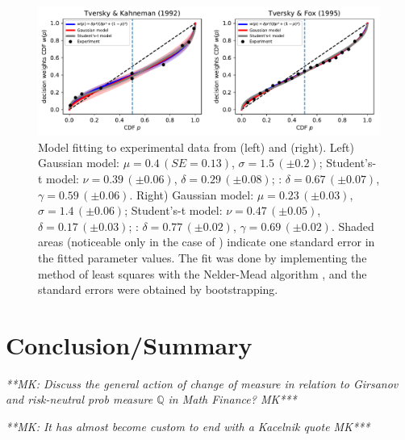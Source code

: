 \documentclass[a4paper, 12pt]{article}
\newcommand{\flabel}[1]{\label{fig:#1}}
\newcommand{\MK}[1]{{\it ***MK: #1 MK***}}
\begin{document}
\begin{figure}[htb]
\centering
\includegraphics[width=1.0\textwidth]{./figs/TK_TF_fit.pdf}
\caption{Model fitting to experimental data from \cite{TverskyKahneman1992} (left) and \cite{TverskyFox1995} (right).
Left) Gaussian model: $\mu=0.4\,\left(SE = 0.13\right)$, $\sigma=1.5\,\left(\pm0.2\right)$; Student's-t model: $\nu=0.39\,\left(\pm0.06\right)$, $\delta=0.29\,\left(\pm0.08\right)$; \cite{LattimoreBakerWitte1992}: $\delta=0.67\,\left(\pm0.07\right)$, $\gamma=0.59\,\left(\pm0.06\right)$. Right) Gaussian model: $\mu=0.23\,\left(\pm0.03\right)$, $\sigma=1.4\,\left(\pm0.06\right)$; Student's-t model: $\nu=0.47\,\left(\pm0.05\right)$, $\delta=0.17\,\left(\pm0.03\right)$; \cite{LattimoreBakerWitte1992}: $\delta=0.77\,\left(\pm0.02\right)$, $\gamma=0.69\,\left(\pm0.02\right)$. Shaded areas (noticeable only in the case of \cite{TverskyKahneman1992}) indicate one standard error in the fitted parameter values. The fit was done by implementing the method of least squares with the Nelder-Mead algorithm \cite{NelderMead1965}, and the standard errors were obtained by bootstrapping.}
\flabel{TK_TF_fit}
\end{figure}


\section{Conclusion/Summary}
\MK{Discuss the general action of change of measure in relation to Girsanov and risk-neutral prob measure $\mathbb{Q}$ in Math Finance?}

\MK{It has almost become custom to end with a Kacelnik quote}





\end{document}
